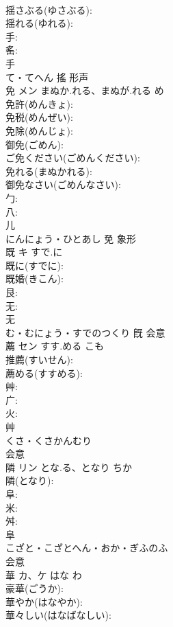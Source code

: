 \documentclass[8pt]{extreport}
\begin{document}
\begin{CJK}{UTF8}{min}
\\	揺さぶる(ゆさぶる): 
\\	揺れる(ゆれる): 
\\	手: 
\\	䍃: 
\\	手	
\\	て・てへん	搖	形声 
\\	免	メン	まぬか.れる、まぬが.れる	め	
\\	免許(めんきょ): 
\\	免税(めんぜい): 
\\	免除(めんじょ): 
\\	御免(ごめん): 
\\	ご免ください(ごめんください): 
\\	免れる(まぬかれる): 
\\	御免なさい(ごめんなさい): 
\\	勹: 
\\	八: 
\\	儿	
\\	にんにょう・ひとあし	免	象形 
\\	既	キ	すで.に		
\\	既に(すでに): 
\\	既婚(きこん): 
\\	艮: 
\\	无: 
\\	无	
\\	む・むにょう・すでのつくり	既	会意 
\\	薦	セン	すす.める	こも	
\\	推薦(すいせん): 
\\	薦める(すすめる): 
\\	艸: 
\\	广: 
\\	火: 
\\	艸	
\\	くさ・くさかんむり	
\\	会意 
\\	隣	リン	とな.る、となり	ちか	
\\	隣(となり): 
\\	阜: 
\\	米: 
\\	舛: 
\\	阜	
\\	こざと・こざとへん・おか・ぎふのふ	
\\	会意 
\\	華	カ、ケ	はな	わ	
\\	豪華(ごうか): 
\\	華やか(はなやか): 
\\	華々しい(はなばなしい): 

\end{CJK}
\end{document}
